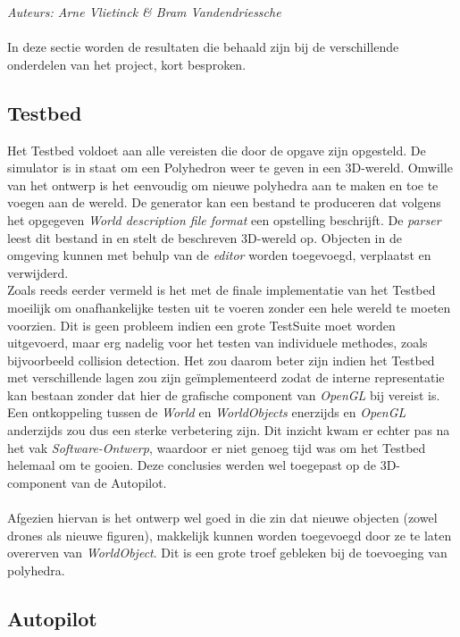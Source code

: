 {\em Auteurs: Arne Vlietinck \& Bram Vandendriessche}
\\\\
In deze sectie worden de resultaten die behaald zijn bij de verschillende onderdelen van het project, kort besproken. 
\subsection{Testbed}
Het Testbed voldoet aan alle vereisten die door de opgave zijn opgesteld. De simulator is in staat om een Polyhedron weer te geven in een 3D-wereld. Omwille van het ontwerp is het eenvoudig om nieuwe polyhedra aan te maken en toe te voegen aan de wereld. De generator kan een bestand te produceren dat volgens het opgegeven \textit{World description file format} een opstelling beschrijft. De \textit{parser} leest dit bestand in en stelt de beschreven 3D-wereld op. Objecten in de omgeving kunnen met behulp van de \textit{editor} worden toegevoegd, verplaatst en verwijderd.
\\
\noindent
Zoals reeds eerder vermeld is het met de finale implementatie van het Testbed moeilijk om onafhankelijke testen uit te voeren zonder een hele wereld te moeten voorzien. Dit is geen probleem indien een grote TestSuite moet worden uitgevoerd, maar erg nadelig voor het testen van individuele methodes, zoals bijvoorbeeld collision detection. Het zou daarom beter zijn indien het Testbed met verschillende lagen zou zijn ge\"implementeerd zodat de interne representatie kan bestaan zonder dat hier de grafische component van \textit{OpenGL} bij vereist is. Een ontkoppeling tussen de \textit{World} en \textit{WorldObjects} enerzijds en \textit{OpenGL} anderzijds zou dus een sterke verbetering zijn. Dit inzicht kwam er echter pas na het vak \textit{Software-Ontwerp}, waardoor er niet genoeg tijd was om het Testbed helemaal om te gooien. Deze conclusies werden wel toegepast op de 3D-component van de Autopilot.\\
\\
\noindent
Afgezien hiervan is het ontwerp wel goed in die zin dat nieuwe objecten (zowel drones als nieuwe figuren), makkelijk kunnen worden toegevoegd door ze te laten overerven van \textit{WorldObject}. Dit is een grote troef gebleken bij de toevoeging van polyhedra.


\subsection{Autopilot}
